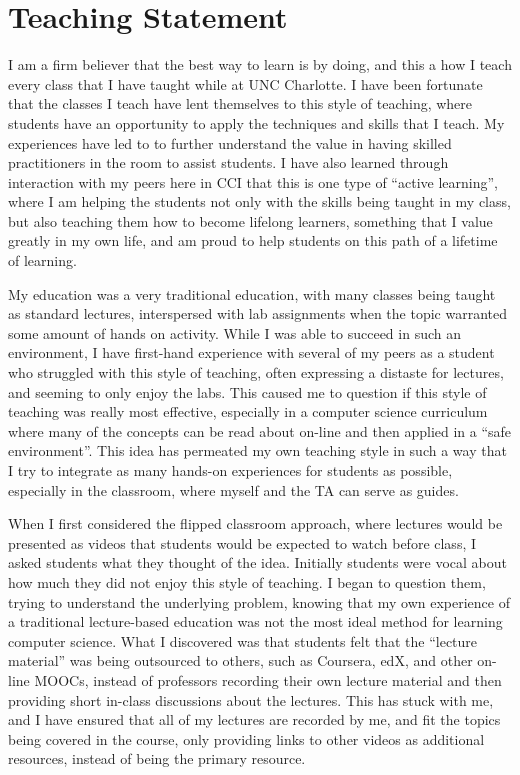 \clearpage
\hypertarget{teaching-statement}{%
\section{Teaching Statement}\label{teaching-statement}}

I am a firm believer that the best way to learn is by doing, and this a how I teach every class that I have taught while at UNC Charlotte. I have been fortunate that the classes I teach have lent themselves to this style of teaching, where students have an opportunity to apply the techniques and skills that I teach. My experiences have led to to further understand the value in having skilled practitioners in the room to assist students. I have also learned through interaction with my peers here in CCI that this is one type of ``active learning'', where I am helping the students not only with the skills being taught in my class, but also teaching them how to become lifelong learners, something that I value greatly in my own life, and am proud to help students on this path of a lifetime of learning.

My education was a very traditional education, with many classes being taught as standard lectures, interspersed with lab assignments when the topic warranted some amount of hands on activity. While I was able to succeed in such an environment, I have first-hand experience with several of my peers as a student who struggled with this style of teaching, often expressing a distaste for lectures, and seeming to only enjoy the labs. This caused me to question if this style of teaching was really most effective, especially in a computer science curriculum where many of the concepts can be read about on-line and then applied in a ``safe environment''. This idea has permeated my own teaching style in such a way that I try to integrate as many hands-on experiences for students as possible, especially in the classroom, where myself and the TA can serve as guides.

When I first considered the flipped classroom approach, where lectures would be presented as videos that students would be expected to watch before class, I asked students what they thought of the idea. Initially students were vocal about how much they did not enjoy this style of teaching. I began to question them, trying to understand the underlying problem, knowing that my own experience of a traditional lecture-based education was not the most ideal method for learning computer science. What I discovered was that students felt that the ``lecture material'' was being outsourced to others, such as Coursera, edX, and other on-line MOOCs, instead of professors recording their own lecture material and then providing short in-class discussions about the lectures. This has stuck with me, and I have ensured that all of my lectures are recorded by me, and fit the topics being covered in the course, only providing links to other videos as additional resources, instead of being the primary resource.

